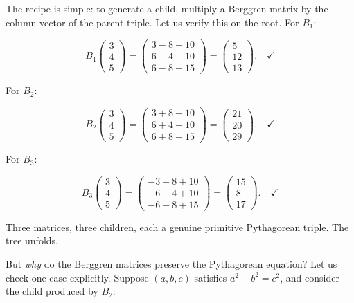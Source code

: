 \documentclass[11pt,twoside,openright]{book}
\theoremstyle{definition}
\theoremstyle{remark}
\begin{document}
The recipe is simple: to generate a child, multiply a Berggren matrix by the column vector of the parent triple. Let us verify this on the root. For $B_1$:

\[B_1 \begin{pmatrix} 3 \\ 4 \\ 5 \end{pmatrix} = \begin{pmatrix} 3 - 8 + 10 \\ 6 - 4 + 10 \\ 6 - 8 + 15 \end{pmatrix} = \begin{pmatrix} 5 \\ 12 \\ 13 \end{pmatrix}. \quad \checkmark\]

For $B_2$:

\[B_2 \begin{pmatrix} 3 \\ 4 \\ 5 \end{pmatrix} = \begin{pmatrix} 3 + 8 + 10 \\ 6 + 4 + 10 \\ 6 + 8 + 15 \end{pmatrix} = \begin{pmatrix} 21 \\ 20 \\ 29 \end{pmatrix}. \quad \checkmark\]

For $B_3$:

\[B_3 \begin{pmatrix} 3 \\ 4 \\ 5 \end{pmatrix} = \begin{pmatrix} -3 + 8 + 10 \\ -6 + 4 + 10 \\ -6 + 8 + 15 \end{pmatrix} = \begin{pmatrix} 15 \\ 8 \\ 17 \end{pmatrix}. \quad \checkmark\]

Three matrices, three children, each a genuine primitive Pythagorean triple. The tree unfolds.


But \textit{why} do the Berggren matrices preserve the Pythagorean equation? Let us check one case explicitly. Suppose $(a, b, c)$ satisfies $a^2 + b^2 = c^2$, and consider the child produced by $B_2$:
\end{document}
